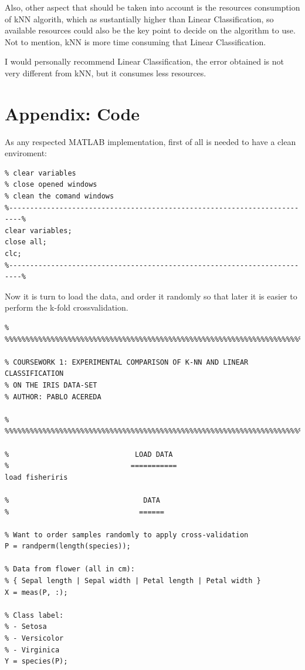 \documentclass[11pt]{article}
\begin{document}
Also, other aspect that should be taken into account is the resources
consumption of kNN algorith, which as sustantially higher than Linear
Classification, so available resources could also be the key point to decide on 
the algorithm to use. Not to mention, kNN is more time consuming that Linear
Classification. 

I would personally recommend Linear Classification, the error obtained is not
very different from kNN, but it consumes less resources.

\newpage

\section*{Appendix: Code}

As any respected MATLAB implementation, first of all is needed to have a clean
enviroment:

\begin{verbatim}
% clear variables
% close opened windows
% clean the comand windows
%-------------------------------------------------------------------------%
clear variables;
close all;
clc;
%-------------------------------------------------------------------------%
\end{verbatim}

Now it is turn to load the data, and order it randomly so that later it is
easier to perform the k-fold crossvalidation.

\begin{verbatim}
% %%%%%%%%%%%%%%%%%%%%%%%%%%%%%%%%%%%%%%%%%%%%%%%%%%%%%%%%%%%%%%%%%%%%%%%%%

% COURSEWORK 1: EXPERIMENTAL COMPARISON OF K-NN AND LINEAR CLASSIFICATION
% ON THE IRIS DATA-SET
% AUTHOR: PABLO ACEREDA

% %%%%%%%%%%%%%%%%%%%%%%%%%%%%%%%%%%%%%%%%%%%%%%%%%%%%%%%%%%%%%%%%%%%%%%%%%

%                              LOAD DATA
%                             ===========
load fisheriris
    
%                                DATA 
%                               ======
    
% Want to order samples randomly to apply cross-validation
P = randperm(length(species));

% Data from flower (all in cm):
% { Sepal length | Sepal width | Petal length | Petal width }
X = meas(P, :);

% Class label:
% - Setosa
% - Versicolor
% - Virginica
Y = species(P);
\end{verbatim}
\end{document}
